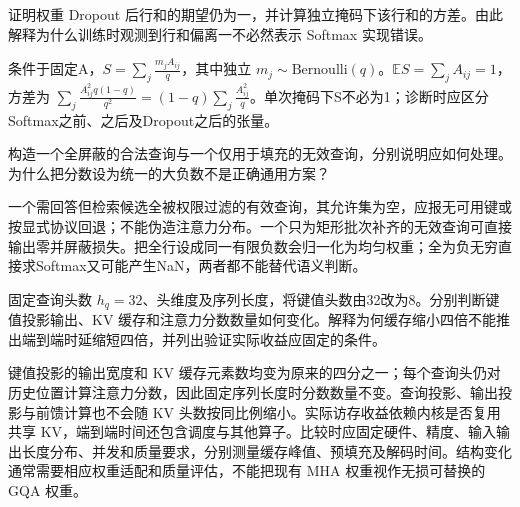 \begin{exercises}
\begin{exercise}\optional 证明权重 Dropout 后行和的期望仍为一，并计算独立掩码下该行和的方差。由此解释为什么训练时观测到行和偏离一不必然表示 Softmax 实现错误。

\begin{solution}
条件于固定A，$S=\sum_j\frac{m_jA_{ij}}{q}$，其中独立 $m_j\sim\mathrm{Bernoulli}(q)$。$\mathbb ES=\sum_jA_{ij}=1$，方差为 $\sum_j\frac{A_{ij}^2q(1-q)}{q^2}=(1-q)\sum_j\frac{A_{ij}^2}{q}$。单次掩码下S不必为1；诊断时应区分Softmax之前、之后及Dropout之后的张量。
\end{solution}
\end{exercise}

\begin{exercise} 构造一个全屏蔽的合法查询与一个仅用于填充的无效查询，分别说明应如何处理。为什么把分数设为统一的大负数不是正确通用方案？

\begin{solution}
一个需回答但检索候选全被权限过滤的有效查询，其允许集为空，应报无可用键或按显式协议回退；不能伪造注意力分布。一个只为矩形批次补齐的无效查询可直接输出零并屏蔽损失。把全行设成同一有限负数会归一化为均匀权重；全为负无穷直接求Softmax又可能产生NaN，两者都不能替代语义判断。
\end{solution}
\end{exercise}

\begin{exercise} 固定查询头数 $h_q=32$、头维度及序列长度，将键值头数由32改为8。分别判断键值投影输出、KV 缓存和注意力分数数量如何变化。解释为何缓存缩小四倍不能推出端到端时延缩短四倍，并列出验证实际收益应固定的条件。

\begin{solution}
键值投影的输出宽度和 KV 缓存元素数均变为原来的四分之一；每个查询头仍对历史位置计算注意力分数，因此固定序列长度时分数数量不变。查询投影、输出投影与前馈计算也不会随 KV 头数按同比例缩小。实际访存收益依赖内核是否复用共享 KV，端到端时间还包含调度与其他算子。比较时应固定硬件、精度、输入输出长度分布、并发和质量要求，分别测量缓存峰值、预填充及解码时间。结构变化通常需要相应权重适配和质量评估，不能把现有 MHA 权重视作无损可替换的 GQA 权重。
\end{solution}
\end{exercise}

\end{exercises}
